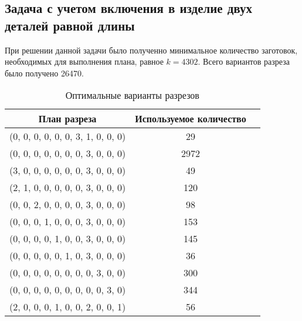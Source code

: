 \documentclass[../body.tex]{subfiles}
\begin{document}
\subsection{Задача с учетом включения в изделие двух деталей равной длины}
При решении данной задачи было полученно минимальное количество заготовок, необходимых для выполнения плана, равное $k=4302$. Всего вариантов разреза было получено 26470.
\begin{table}[H]
    \centering
    \begin{tabular}{|c|c|c|}
        \hline
        План разреза & Используемое количество\\\hline
        (0, 0, 0, 0, 0, 0, 3, 1, 0, 0, 0) & 29\\\hline
        (0, 0, 0, 0, 0, 0, 0, 3, 0, 0, 0) & 2972\\\hline
        (3, 0, 0, 0, 0, 0, 0, 3, 0, 0, 0) & 49\\\hline
        (2, 1, 0, 0, 0, 0, 0, 3, 0, 0, 0) & 120\\\hline
        (0, 0, 2, 0, 0, 0, 0, 3, 0, 0, 0) & 98\\\hline
        (0, 0, 0, 1, 0, 0, 0, 3, 0, 0, 0) & 153\\\hline
        (0, 0, 0, 0, 1, 0, 0, 3, 0, 0, 0) & 145\\\hline
        (0, 0, 0, 0, 0, 1, 0, 3, 0, 0, 0) & 36\\\hline
        (0, 0, 0, 0, 0, 0, 0, 0, 3, 0, 0) & 300\\\hline
        (0, 0, 0, 0, 0, 0, 0, 0, 0, 3, 0) & 344\\\hline
        (2, 0, 0, 0, 1, 0, 0, 2, 0, 0, 1) & 56\\\hline
    \end{tabular}
    \caption{Оптимальные варианты разрезов}
\end{table}
\end{document}
